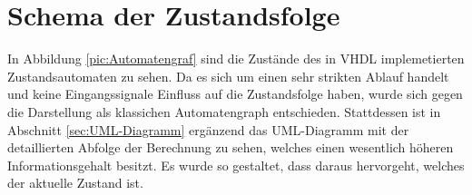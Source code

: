 


 

 

%

\section{Schema der Zustandsfolge}
In Abbildung \ref{pic:Automatengraf} sind die Zustände des in VHDL implemetierten Zustandsautomaten zu sehen. Da es sich um einen sehr strikten Ablauf handelt und
keine Eingangssignale Einfluss auf die Zustandsfolge haben, wurde sich gegen die Darstellung als klassichen Automatengraph entschieden. 
Stattdessen ist in Abschnitt \ref{sec:UML-Diagramm} ergänzend das UML-Diagramm mit der detaillierten Abfolge der Berechnung zu sehen, welches einen wesentlich höheren 
Informationsgehalt besitzt. Es wurde so gestaltet, dass daraus hervorgeht, welches der aktuelle Zustand ist.


